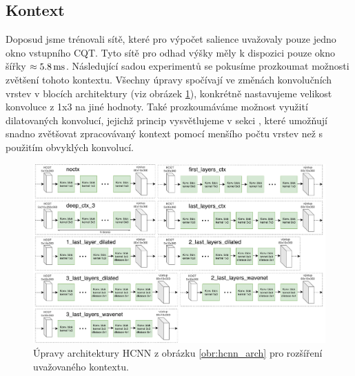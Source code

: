 


\subsection{Kontext}

Doposud jsme trénovali sítě, které pro výpočet salience uvažovaly pouze jedno okno vstupního CQT. Tyto sítě pro odhad výšky měly k dispozici pouze okno šířky $\approx 5.8\,\rm ms$. Následující sadou experimentů se pokusíme prozkoumat možnosti zvětšení tohoto kontextu. Všechny úpravy spočívají ve změnách konvolučních vrstev v blocích architektury (viz obrázek \ref{obr:hcnn_context_archs}), konkrétně nastavujeme velikost konvoluce z 1x3 na jiné hodnoty. Také prozkoumáváme možnost využití dilatovaných konvolucí, jejichž princip vysvětlujeme v sekci , které umožňují snadno zvětšovat zpracovávaný kontext pomocí menšího počtu vrstev než s použitím obvyklých konvolucí.

\begin{figure}[h]\centering
    \includegraphics[width=\textwidth,height=\textheight,keepaspectratio]{../img/hcnn_context_archs_4}
\caption{Úpravy architektury HCNN z obrázku \ref{obr:hcnn_arch} pro rozšíření uvažovaného kontextu.}\label{obr:hcnn_context_archs}
\end{figure}


